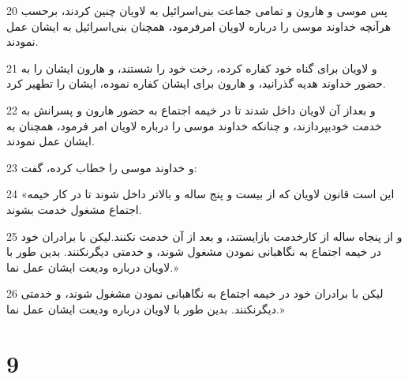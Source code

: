 \par 20 پس موسی و هارون و تمامی جماعت بنی‌اسرائیل به لاویان چنین کردند، برحسب هرآنچه خداوند موسی را درباره لاویان امرفرمود، همچنان بنی‌اسرائیل به ایشان عمل نمودند.
\par 21 و لاویان برای گناه خود کفاره کرده، رخت خود را شستند، و هارون ایشان را به حضور خداوند هدیه گذرانید، و هارون برای ایشان کفاره نموده، ایشان را تطهیر کرد.
\par 22 و بعداز آن لاویان داخل شدند تا در خیمه اجتماع به حضور هارون و پسرانش به خدمت خودبپردازند، و چنانکه خداوند موسی را درباره لاویان امر فرمود، همچنان به ایشان عمل نمودند.
\par 23 و خداوند موسی را خطاب کرده، گفت:
\par 24 «این است قانون لاویان که از بیست و پنج ساله و بالاتر داخل شوند تا در کار خیمه اجتماع مشغول خدمت بشوند.
\par 25 و از پنجاه ساله از کارخدمت بازایستند، و بعد از آن خدمت نکنند.لیکن با برادران خود در خیمه اجتماع به نگاهبانی نمودن مشغول شوند، و خدمتی دیگرنکنند. بدین طور با لاویان درباره ودیعت ایشان عمل نما.»
\par 26 لیکن با برادران خود در خیمه اجتماع به نگاهبانی نمودن مشغول شوند، و خدمتی دیگرنکنند. بدین طور با لاویان درباره ودیعت ایشان عمل نما.»
 
\chapter{9}

